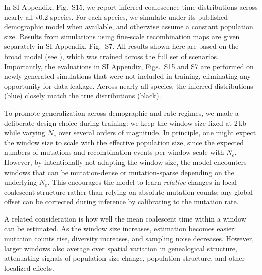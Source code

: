 \documentclass[9pt,twocolumn,twoside]{pnas-new}
\begin{document}

In SI Appendix, Fig.~S15, we report inferred coalescence time distributions across nearly all \stdpopsim v0.2 species. 
For each species, we simulate under its published demographic model when available, and otherwise assume a constant population size.
Results from simulations using fine-scale recombination maps are given separately in SI Appendix, Fig.~S7.
All results shown here are based on the \cxtkit-broad model (see ), which was trained across the full set of scenarios.
Importantly, the evaluations in SI Appendix, Figs.~S15 and S7 are performed on newly generated simulations
that were not included in training, eliminating any opportunity for data leakage. 
Across nearly all species, the inferred distributions (blue) closely match the true distributions (black).


To promote generalization across demographic and rate regimes, 
we made a deliberate design choice during training: 
we keep the window size fixed at 2\,kb while varying $N_e$ over several orders of magnitude.
In principle, one might expect the window size to scale with the effective population size, 
since the expected numbers of mutations and recombination events per window scale with $N_e$. 
However, by intentionally not adapting the window size, the model encounters windows that can be
mutation-dense or mutation-sparse depending on the underlying $N_e$. 
This encourages the model to learn \emph{relative} changes in local coalescent structure rather than relying on absolute mutation counts;
any global offset can be corrected during inference by calibrating to the mutation rate.

A related consideration is how well the mean coalescent time within a window can be estimated. 
As the window size increases, estimation becomes easier: mutation counts rise, diversity increases, and sampling noise decreases.
However, larger windows also average over spatial variation in genealogical structure, attenuating signals of population-size change, population structure, and other localized effects.
\end{document}
